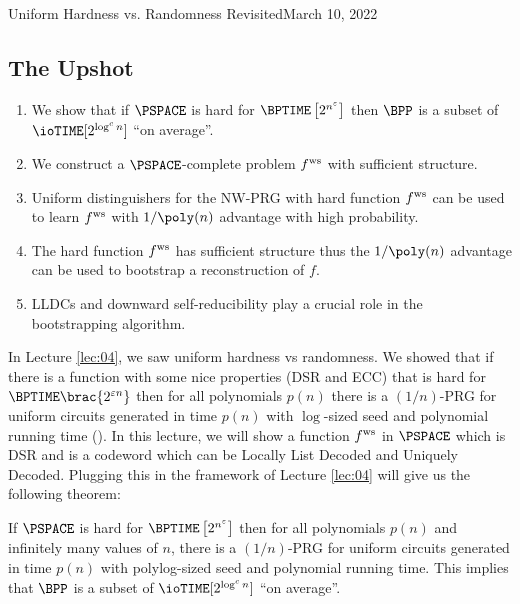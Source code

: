 \newcommand{\fn}{\mathbb{F}_n}
\newcommand\antipi{\rotatebox[origin=c]{180}{$\Pi$}}

\begin{lecture}{8}{Uniform Hardness vs. Randomness Revisited}{March 10, 2022}\label{lec:08}

\subsection*{The Upshot}

\begin{enumerate}
	\item We show that if $\PSPACE$ is hard for $\BPTIME\left[2^{n^\eps}\right]$ then $\BPP$ is a subset of \\ $\ioTIME[2^{\log^c n}]$ ``on average''.
	\item We construct a $\PSPACE$-complete problem $ f^{\text{ws}} $ with sufficient structure.
	\item Uniform distinguishers for the NW-PRG with hard function $ f^{\text{ws}} $ can be
	used to learn $ f^{\text{ws}} $ with $1/\poly(n)$ advantage with high probability.
	\item The hard function $ f^{\text{ws}} $ has sufficient structure thus the $1/\poly(n)$
	advantage can be used to bootstrap a reconstruction of $f$.
	\item LLDCs and downward self-reducibility play a crucial role in the
	bootstrapping algorithm.
\end{enumerate}

In Lecture \ref{lec:04}, we saw uniform hardness vs randomness. We showed that if there is a function with some nice properties (DSR and ECC) that is hard for $\BPTIME\brac{2^{\eps n}}$ then for all polynomials $p(n)$ there is a $(1 / n)$-PRG for uniform circuits generated in time $p(n)$ with $\log$-sized seed and polynomial running time (). 
In this lecture, we will show a function $ f^{\text{ws}} $ in $\PSPACE$ which is DSR and  is a codeword which can be Locally List Decoded and Uniquely Decoded. Plugging this in the framework of Lecture \ref{lec:04} will give us the following theorem:
\begin{theorem}\label{thm:uniform-hard-random-PSPACE}
	If $\PSPACE$ is hard for $\BPTIME\left[2^{n^\eps}\right]$ then for all polynomials $p(n)$ and infinitely many values of $n$, there is a $(1/n)$-PRG for uniform circuits generated in time $p(n)$ with polylog-sized seed and polynomial running time. This implies that $\BPP$ is a subset of $\ioTIME[2^{\log^c n}]$ ``on average''.
\end{theorem}



\end{lecture}
